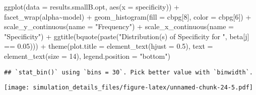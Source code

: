 \documentclass[
]{article}
\newenvironment{Shaded}{\begin{snugshade}}{\end{snugshade}}
\newcommand{\AttributeTok}[1]{\textcolor[rgb]{0.77,0.63,0.00}{#1}}
\newcommand{\DecValTok}[1]{\textcolor[rgb]{0.00,0.00,0.81}{#1}}
\newcommand{\FloatTok}[1]{\textcolor[rgb]{0.00,0.00,0.81}{#1}}
\newcommand{\FunctionTok}[1]{\textcolor[rgb]{0.00,0.00,0.00}{#1}}
\newcommand{\NormalTok}[1]{#1}
\newcommand{\SpecialCharTok}[1]{\textcolor[rgb]{0.00,0.00,0.00}{#1}}
\newcommand{\StringTok}[1]{\textcolor[rgb]{0.31,0.60,0.02}{#1}}
\begin{document}
\begin{Shaded}
\begin{Highlighting}[]
\FunctionTok{ggplot}\NormalTok{(}\AttributeTok{data =}\NormalTok{ results.smallB.opt,}
       \FunctionTok{aes}\NormalTok{(}\AttributeTok{x =}\NormalTok{ specificity)) }\SpecialCharTok{+}
  \FunctionTok{facet\_wrap}\NormalTok{(alpha}\SpecialCharTok{\textasciitilde{}}\NormalTok{model) }\SpecialCharTok{+}
  \FunctionTok{geom\_histogram}\NormalTok{(}\AttributeTok{fill =}\NormalTok{ cbpg[}\DecValTok{8}\NormalTok{], }\AttributeTok{color =}\NormalTok{ cbpg[}\DecValTok{6}\NormalTok{]) }\SpecialCharTok{+}
  \FunctionTok{scale\_y\_continuous}\NormalTok{(}\AttributeTok{name =} \StringTok{"Frequency"}\NormalTok{) }\SpecialCharTok{+}
  \FunctionTok{scale\_x\_continuous}\NormalTok{(}\AttributeTok{name =} \StringTok{"Specificity"}\NormalTok{) }\SpecialCharTok{+}
  \FunctionTok{ggtitle}\NormalTok{(}\FunctionTok{bquote}\NormalTok{(}\FunctionTok{paste}\NormalTok{(}\StringTok{"Distribution(s) of Specificity for "}\NormalTok{, beta[j] }\SpecialCharTok{==} \FloatTok{0.05}\NormalTok{))) }\SpecialCharTok{+}
  \FunctionTok{theme}\NormalTok{(}\AttributeTok{plot.title =} \FunctionTok{element\_text}\NormalTok{(}\AttributeTok{hjust =} \FloatTok{0.5}\NormalTok{), }
        \AttributeTok{text =} \FunctionTok{element\_text}\NormalTok{(}\AttributeTok{size =} \DecValTok{14}\NormalTok{),}
        \AttributeTok{legend.position =} \StringTok{"bottom"}\NormalTok{)}
\end{Highlighting}
\end{Shaded}

\begin{verbatim}
## `stat_bin()` using `bins = 30`. Pick better value with `binwidth`.
\end{verbatim}

\texttt{[image: simulation\_details\_files/figure-latex/unnamed-chunk-24-5.pdf]}
\end{document}
